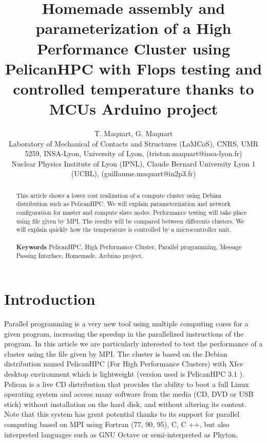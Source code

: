 \documentclass[11pt,a4paper]{article}
\title{Homemade assembly and parameterization of a High Performance Cluster using PelicanHPC with Flops testing and controlled temperature thanks to MCUs Arduino project}
\author{T. Maquart, G. Maquart\\Laboratory of Mechanical of Contacts and Structures (LaMCoS), CNRS, UMR 5259, INSA-Lyon,  University of Lyon, (tristan.maquart@insa-lyon.fr)\\Nuclear Physics Institute of Lyon (IPNL), Claude Bernard University Lyon 1 (UCBL), (guillaume.maquart@in2p3.fr)}
\begin{document}
\maketitle
\begin{abstract}
\noindent
This article shows a lower cost realization of a compute cluster using Debian distribution such as PelicanHPC.
We will explain parameterization and network configuration for master and compute slave nodes. Performance testing will take place using  file given by MPI. The results will be compared between differents clusters. We will explain quickly how the temperature is controlled by a microcontroller unit. \\\\
\textbf{Keywords} PelicanHPC, High Performance Cluster, Parallel programming, Message Passing Interface, Homemade, Arduino project.
\end{abstract}
\section{Introduction}
\noindent
Parallel programming is a very new tool using multiple computing cores for a given program, increasing the speedup in the parallelized instructions of the program. In this article we are particularly interested to test the performance of a cluster using the  file given by MPI. The cluster is based on the Debian distribution named PelicanHPC \cite{pelicanHPC} (For High Performance Clusters) with Xfce desktop environment which is lightweight (version used is PelicanHPC 3.1 \cite{down1}). Pelican is a live CD distribution that provides the ability to boot a full Linux operating system and access many software from the media (CD, DVD or USB stick) without installation on the hard disk, and without altering its content. Note that this system has great potential thanks to its support for parallel computing based on MPI using Fortran (77, 90, 95), C, C ++, but also interpreted languages ​​such as GNU Octave or semi-interpreted as Phyton.
\end{document}
